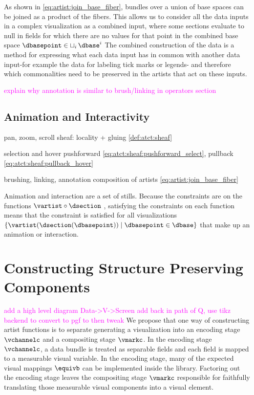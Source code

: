 \documentclass[journal]{IEEEtran}
\newcommand{\note}[1]{\textcolor{magenta}{#1}}
\theoremstyle{definition}
\theoremstyle{remark}
\begin{document}
As shown in \autoref{eq:artist:join_base_fiber}, bundles over a union of base spaces can be joined as a product of the fibers. This allows us to consider all the data inputs in a complex visualization as a combined input, where some sections evaluate to null in fields for which there are no values for that point in the combined base space $\dbasepoint \in \mathop{\sqcup}_{i} \dbase^{i}$ The combined construction of the data is a method for expressing what each data input has in common with another data input-for example the data for labeling tick marks or legends-
and therefore which commonalities need to be preserved in the artists that act on these inputs.

\note{explain why annotation is similar to brush/linking in operators section }

\subsection{Animation and Interactivity}


\begin{LaTeXdescription}
  \item[pan, zoom, scroll] sheaf: locality + gluing \autoref{def:atct:sheaf}
  \item[selection and hover] pushforward \autoref{eq:atct:sheaf:pushforward_select},  pullback \autoref{eq:atct:sheaf:pullback_hover}
  \item[brushing, linking, annotation] composition of artists \autoref{eq:artist:join_base_fiber}
\end{LaTeXdescription}

Animation and interaction are a set of stills. Because the constraints are on the functions $\vartist\circ\dsection$ , satisfying the constraints on each function means that the constraint is satisfied for all visualizations $\{\vartist(\dsection(\dbasepoint)) \mid\dbasepoint \in \dbase \}$ that make up an animation or interaction.



\section{Constructing Structure Preserving Components}
\label{sec:construction}
\note{add a high level diagram Data->V->Screen}
\note{add back in path of Q, use tikz backend to convert to pgf to then tweak}
We propose that one way of constructing artist functions is to separate generating a visualization into an encoding stage $\vchannelc$ and a compositing stage $\vmarkc$. In the \textcolor{artist}{encoding} stage $\vchannelc$, a data bundle is treated as separable fields and each field is mapped to a measurable visual variable. In the encoding stage, many of the expected visual mappings $\equivb$ can be implemented inside the library. Factoring out the encoding stage leaves the \textcolor{artist}{compositing} stage $\vmarkc$ responsible for faithfully translating those measurable visual components into a visual element.
\end{document}
